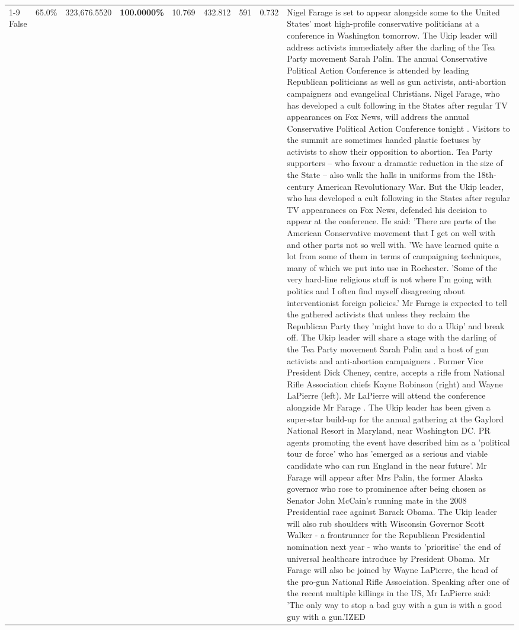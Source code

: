 \begin{table}[H]
\begin{tabular}{lllrlllll}
\cline{1-9}
False & 65.0\% & 323,676.5520 & \bfseries \color{red} 100.0000\% & 10.769 & 432.812 & 591 & 0.732 & Nigel Farage is set to appear alongside some to the United States' most high-profile conservative politicians at a conference in Washington tomorrow. The Ukip leader will address activists immediately after the darling of the Tea Party movement Sarah Palin. The annual Conservative Political Action Conference is attended by leading Republican politicians as well as gun activists, anti-abortion campaigners and evangelical Christians. Nigel Farage, who has developed a cult following in the States after regular TV appearances on Fox News, will address the annual Conservative Political Action Conference tonight . Visitors to the summit are sometimes handed plastic foetuses by activists to show their opposition to abortion. Tea Party supporters – who favour a dramatic reduction in the size of the State – also walk the halls in uniforms from the 18th-century American Revolutionary War. But the Ukip leader, who has developed a cult following in the States after regular TV appearances on Fox News, defended his decision to appear at the conference. He said: 'There are parts of the American Conservative movement that I get on well with and other parts not so well with. 'We have learned quite a lot from some of them in terms of campaigning techniques, many of which we put into use in Rochester. 'Some of the very hard-line religious stuff is not where I'm going with politics and I often find myself disagreeing about interventionist foreign policies.' Mr Farage is expected to tell the gathered activists that unless they reclaim the Republican Party they 'might have to do a Ukip' and break off. The Ukip leader will share a stage with the darling of the Tea Party movement Sarah Palin and a host of gun activists and anti-abortion campaigners . Former Vice President Dick Cheney, centre, accepts a rifle from National Rifle Association chiefs Kayne Robinson (right) and Wayne LaPierre (left). Mr LaPierre will attend the conference alongside Mr Farage . The Ukip leader has been given a super-star build-up for the annual gathering at the Gaylord National Resort in Maryland, near Washington DC. PR agents promoting the event have described him as a 'political tour de force' who has 'emerged as a serious and viable candidate who can run England in the near future'. Mr Farage will appear after Mrs Palin, the former Alaska governor who rose to prominence after being chosen as Senator John McCain's running mate in the 2008 Presidential race against Barack Obama. The Ukip leader will also rub shoulders with Wisconsin Governor Scott Walker - a frontrunner for the Republican Presidential nomination next year - who wants to 'prioritise' the end of universal healthcare introduce by President Obama. Mr Farage will also be joined by Wayne LaPierre, the head of the pro-gun National Rifle Association. Speaking after one of the recent multiple killings in the US, Mr LaPierre said: 'The only way to stop a bad guy with a gun is with a good guy with a gun.'IZED \\

\end{tabular}
\end{table}

